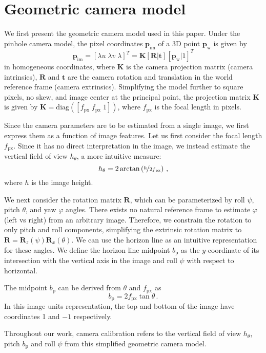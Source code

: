 \section{Geometric camera model}
\label{sec:camera-model}

We first present the geometric camera model used in this paper. 
Under the pinhole camera model, the pixel coordinates $\mathbf{p}_\mathrm{im}$ of a 3D point $\mathbf{p}_\mathrm{w}$ is given by
%
\begin{equation}
\mathbf{p}_{\mathrm{im}} = [\lambda u \; \lambda v \; \lambda]^T = \mathbf{K} \left[\mathbf{R} | \mathbf{t}\right] \left[ \mathbf{p}_{\mathrm{w}} | 1 \right]^T
\end{equation}
%
in homogeneous coordinates, where $\mathbf{K}$ is the camera projection matrix (camera intrinsics), $\mathbf{R}$ and $\mathbf{t}$ are the camera rotation and translation in the world reference frame (camera extrinsics). Simplifying the model further to square pixels, no skew, and image center at the principal point, the projection matrix $\mathbf{K}$ is given by $\mathbf{K} = \mathrm{diag}([f_{\mathrm{px}} \; f_{\mathrm{px}} \; 1])$, where $f_{\mathrm{px}}$ is the focal length in pixels. 

Since the camera parameters are to be estimated from a single image, we first express them as a function of image features. Let us first consider the focal length $f_\mathrm{px}$. Since it has no direct interpretation in the image, we instead estimate the vertical field of view $h_\theta$, a more intuitive measure:
%
\begin{equation}
h_{\theta} = 2 \arctan \left( \nicefrac{ h }{ 2f{_\mathrm{px}} } \right) \,,
\end{equation}
%
where $h$ is the image height.

We next consider the rotation matrix $\mathbf{R}$, which can be parameterized by roll $\psi$, pitch $\theta$, and yaw $\varphi$ angles. There exists no natural reference frame to estimate $\varphi$ (left vs right) from an arbitrary image. Therefore, we constrain the rotation to only pitch and roll components, simplifying the extrinsic rotation matrix to $\mathbf{R} = \mathbf{R}_z(\psi) \mathbf{R}_x(\theta)$. We can use the horizon line as an intuitive representation for these angles. We define the horizon line midpoint $b_{\mathrm{p}}$ as the $y$-coordinate of its intersection with the vertical axis in the image and roll $\psi$ with respect to horizontal.

The midpoint $b_{\mathrm{p}}$ can be derived from $\theta$ and $f_{\mathrm{px}}$ as
%
\begin{equation}
b_{\mathrm{p}} = 2 f_{\mathrm{px}} \tan\theta \,.
\label{eq:horizon_midpoint}
\end{equation}
%
In this image units representation, the top and bottom of the image have coordinates 1 and $-1$ respectively. 

Throughout our work, camera calibration refers to the vertical field of view $h_{\theta}$, pitch $b_{\mathrm{p}}$ and roll $\psi$ from this simplified geometric camera model.
